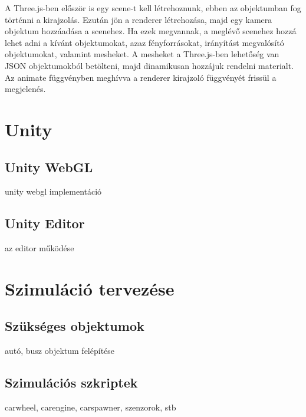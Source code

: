 A Three.js-ben először is egy scene-t kell létrehoznunk, ebben az objektumban fog történni a kirajzolás. Ezután jön a renderer létrehozása, majd egy kamera objektum hozzáadása a scenehez. Ha ezek megvannak, a meglévő scenehez hozzá lehet adni a kívánt objektumokat, azaz fényforrásokat, irányítást megvalósító objektumokat, valamint mesheket. A mesheket a Three.js-ben lehetőség van JSON objektumokból betölteni, majd dinamikusan hozzájuk rendelni materialt. Az animate függvényben meghívva a renderer kirajzoló függvényét frissül a megjelenés.
\section{Unity}
\subsection{Unity WebGL}
unity webgl implementáció
\subsection{Unity Editor}
az editor működése
\section{Szimuláció tervezése}
\subsection{Szükséges objektumok}
autó, busz objektum felépítése
\subsection{Szimulációs szkriptek}
carwheel, carengine, carspawner, szenzorok, stb